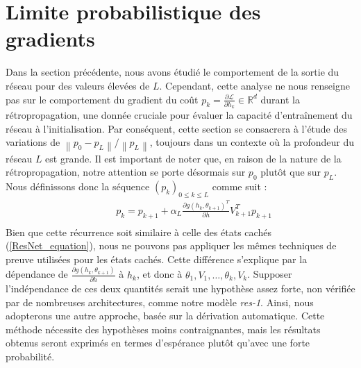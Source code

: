 \section{Limite probabilistique des gradients}

Dans la section précédente, nous avons étudié le comportement de la sortie du réseau pour des valeurs élevées de $L$. Cependant, cette analyse ne nous renseigne pas sur le comportement du gradient du coût $p_k = \frac{\partial \mathcal{L}}{\partial h_k} \in \mathbb{R}^d$ durant la rétropropagation, une donnée cruciale pour évaluer la capacité d'entraînement du réseau à l'initialisation. Par conséquent, cette section se consacrera à l'étude des variations de $\left\| p_0 - p_L \right\| / \left\| p_L \right\|$, toujours dans un contexte où la profondeur du réseau $L$ est grande. Il est important de noter que, en raison de la nature de la rétropropagation, notre attention se porte désormais sur $p_0$ plutôt que sur $p_L$. Nous définissons donc la séquence $(p_k)_{0 \leq k \leq L}$ comme suit :
\begin{align*}
    \qquad & p_k = p_{k+1} + \alpha _L \frac{\partial g(h_k, \theta _{k+1}) ^T}{\partial h}  V_{k+1}^T p_{k+1} \\
\end{align*}
Bien que cette récurrence soit similaire à celle des états cachés (\ref{ResNet_equation}), nous ne pouvons pas appliquer les mêmes techniques de preuve utilisées pour les états cachés. Cette différence s'explique par la dépendance de $\frac{\partial g(h_k, \theta_{k+1})}{\partial h}$ à $h_k$, et donc à $\theta_1, V_1, \dots, \theta_k, V_k$. Supposer l'indépendance de ces deux quantités serait une hypothèse assez forte, non vérifiée par de nombreuses architectures, comme notre modèle \textit{res-1}. Ainsi, nous adopterons une autre approche, basée sur la dérivation automatique. Cette méthode nécessite des hypothèses moins contraignantes, mais les résultats obtenus seront exprimés en termes d'espérance plutôt qu'avec une forte probabilité.

